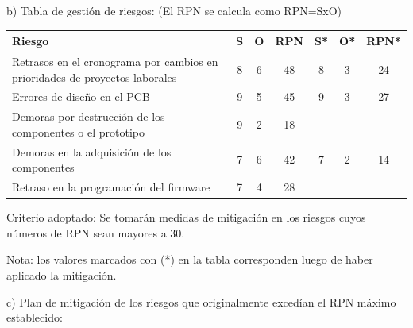 \documentclass[
11pt, %
]{charter}
\begin{document}
b) Tabla de gestión de riesgos:      (El RPN se calcula como RPN=SxO)

\begin{table}[htpb]
\centering
\begin{tabularx}{\linewidth}{@{}|X|c|c|c|c|c|c|@{}}
\hline
\rowcolor[HTML]{C0C0C0} 
Riesgo &                                                                                                                         S & O & RPN & S* & O* & RPN* \\ \hline
Retrasos en el cronograma por cambios en prioridades de proyectos laborales &   	8&  6 &     48&    8&   3&     24  \\ \hline
Errores de diseño en el PCB&   				 					9&   5&     45&    9&   3&     27  \\ \hline
Demoras por destrucción de los componentes o el prototipo&  				9&   2&     18&      &     &           \\ \hline
Demoras en la adquisición de los componentes&   						7&   6&     42&    7&   2&     14  \\ \hline
Retraso en la programación del firmware &  		 					7&   4&    28&       &     &           \\ \hline
\end{tabularx}%
\end{table}

Criterio adoptado: Se tomarán medidas de mitigación en los riesgos cuyos números de RPN sean mayores a 30.

Nota: los valores marcados con (*) en la tabla corresponden luego de haber aplicado la mitigación.


c) Plan de mitigación de los riesgos que originalmente excedían el RPN máximo establecido: 
\end{document}
